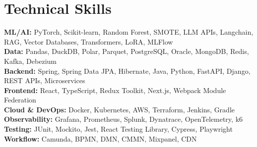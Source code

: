 \documentclass[letterpaper,11pt]{article}
\begin{document}
\section{Technical Skills}
\vspace{-7pt}
\begin{itemize}
[leftmargin=0.15in, label={}]\small{\item{
\textbf{ML/AI:} PyTorch, Scikit-learn, Random Forest, SMOTE, LLM APIs, Langchain, RAG, Vector Databases, Transformers, LoRA, MLFlow \\
\textbf{Data:} Pandas, DuckDB, Polar, Parquet, PostgreSQL, Oracle, MongoDB, Redis, Kafka, Debezium \\
\textbf{Backend:} Spring, Spring Data JPA, Hibernate, Java, Python, FastAPI, Django, REST APIs, Microservices \\
\textbf{Frontend:} React, TypeScript, Redux Toolkit, Next.js, Webpack Module Federation \\
\textbf{Cloud \& DevOps:} Docker, Kubernetes, AWS, Terraform, Jenkins, Gradle \\
\textbf{Observability:} Grafana, Prometheus, Splunk, Dynatrace, OpenTelemetry, k6 \\
\textbf{Testing:} JUnit, Mockito, Jest, React Testing Library, Cypress, Playwright \\
\textbf{Workflow:} Camunda, BPMN, DMN, CMMN, Mixpanel, CDN
}}
\end{itemize}
\end{document}
